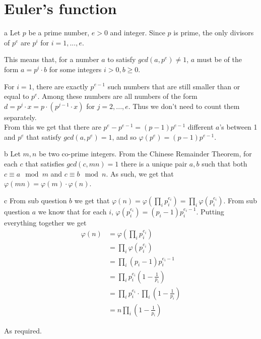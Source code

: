 \documentclass{article}
\begin{document}
\section{Euler's function}
\begin{paragraph}
    a Let \(p\) be a prime number, \(e > 0\) and integer. Since \(p\) is prime, the only divisors of \(p^e\) are \(p^i\) for \(i = 1, ..., e\).
    
    This means that, for a number \(a\) to satisfy \(gcd(a, p^e) \neq 1\), \(a\) must be of the form \(a = p^i \cdot b\) for some integers \(i > 0, b \geq 0\).
    
For \(i = 1\), there are exactly \(p^{e - 1}\) such numbers that are still smaller than or equal to \(p^e\). Among these numbers are all numbers of the form \(d = p^j \cdot x = p \cdot (p^{j - 1} \cdot x)\) for \(j = 2, ..., e\). Thus we don't need to count them separately.\\
    
    From this we get that there are \(p^e - p^{e - 1} = (p - 1) p^{e - 1}\) different \(a\)'s between 1 and \(p^e\) that satisfy \(gcd(a, p^e) = 1\), and so \(\varphi(p^e) = (p - 1) p^{e - 1}\).
\end{paragraph}

\begin{paragraph}
    b Let \(m, n\) be two co-prime integers. From the Chinese Remainder Theorem, for each \(c\) that satisfies \(gcd(c, mn) = 1\) there is a unique pair \(a, b\) such that both \(c \equiv a \mod{m}\) and \(c \equiv b \mod{n}\). As such, we get that \(\varphi(mn) = \varphi(m) \cdot \varphi(n)\). \iffalse Can you go over this? \fi
\end{paragraph}

\begin{paragraph}
    c From sub question \(b\) we get that \(\varphi(n) = \varphi(\prod\limits_i p_i^{e_i}) = \prod\limits_i \varphi(p_i^{e_i})\). From sub question \(a\) we know that for each \(i\), \(\varphi(p_i^{e_i}) = (p_i - 1) p_i^{e_i - 1}\). Putting everything together we get
    \begin{align*}
        \varphi(n) &= \varphi(\prod\limits_i p_i^{e_i})\\
        &= \prod\limits_i \varphi(p_i^{e_i})\\
        &= \prod\limits_i (p_i - 1) p_i^{e_i - 1}\\
        &= \prod\limits_i p_i^{e_i} (1 - \frac{1}{p_i})\\
        &= \prod\limits_i p_i^{e_i} \cdot \prod\limits_i (1 - \frac{1}{p_i})\\
        &= n \prod\limits_i (1 - \frac{1}{p_i})
    \end{align*}
    
    As required.
\end{paragraph}
\newpage
\end{document}
